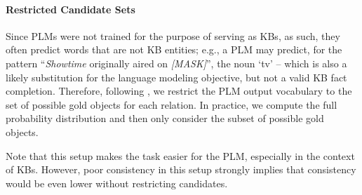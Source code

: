 \paragraph{Restricted Candidate Sets}
Since PLMs were not trained for the purpose of
serving as KBs, as such, they often predict words
that are not KB entities;
e.g., a PLM may predict, for the pattern ``\textit{Showtime} originally aired on \textit{[MASK]}'', the noun
`tv' --  which is also a likely substitution for the language
modeling objective, but not a valid KB fact completion.
Therefore,
following \citep{Xiong2020Pretrained, nora@@},
we
restrict the PLM output vocabulary to the set of possible gold objects for each
relation. In practice, we compute the full probability
distribution and then only consider the subset of possible
gold objects.

Note that this setup makes the task easier for the PLM,
especially in the context of KBs. However, poor
consistency in this setup strongly implies that consistency
would be even lower without restricting candidates.
